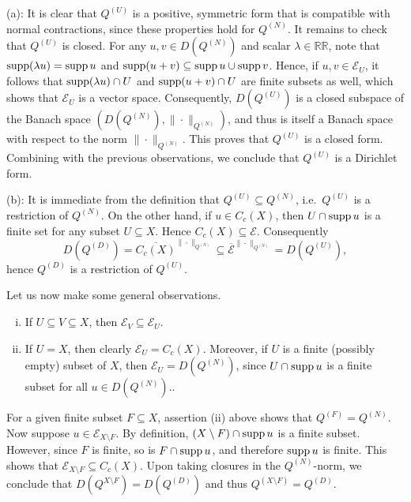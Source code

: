 (a): It is clear that $Q^{(U)}$ is a positive, symmetric form that is compatible with normal contractions, since these properties hold for $Q^{(N)}$. It remains to check that $Q^{(U)}$ is closed. For any $u, v\in D(Q^{(N)})$ and scalar $\lambda\in\mathbb{RR}$, note that $\operatorname{supp} (\lambda u)=\operatorname{supp} u$ and $\operatorname{supp}(u+v) \subseteq \operatorname{supp} u \cup \operatorname{supp} v$. Hence, if $u,v\in\mathcal{E}_U$, it follows that $\operatorname{supp}(\lambda u)\cap U$ and $\operatorname{supp}(u+v)\cap U$ are finite subsets as well, which shows that $\mathcal{E}_U$ is a vector space. Consequently, $D(Q^{(U)})$ is a closed subspace of the Banach space $(D(Q^{(N)}), \|\cdot\|_{Q^{(N)}})$, and thus is itself a Banach space with respect to the norm $\|\cdot\|_{Q^{(N)}}$. This proves that $Q^{(U)}$ is a closed form. Combining with the previous observations, we conclude that $Q^{(U)}$ is a Dirichlet form.

(b): It is immediate from the definition that $Q^{(U)}\subseteq Q^{(N)}$, i.e.\ $Q^{(U)}$ is a restriction of $Q^{(N)}$. On the other hand, if $u \in C_c(X)$, then $U\cap\operatorname{supp} u$ is a finite set for any subset $U\subseteq X$. Hence $C_c(X)\subseteq\mathcal{E}$. Consequently
\begin{equation*}
	D(Q^{(D)}) = \overline{C_c(X)}^{\|\cdot\|_{Q^{(N)}}} \subseteq \overline{\mathcal{E}}^{\|\cdot\|_{Q^{(N)}}} = D(Q^{(U)}),
\end{equation*}
hence $Q^{(D)}$ is a restriction of $Q^{(U)}$.

Let us now make some general observations.
\begin{enumerate}[(i)]
	\item If $U\subseteq V\subseteq X$, then $\mathcal{E}_V\subseteq \mathcal{E}_U$.
	\item If $U=X$, then clearly $\mathcal{E}_U = C_c(X)$. Moreover, if $U$ is a finite (possibly empty) subset of $X$, then $\mathcal{E}_U = D(Q^{(N)})$, since $U\cap\operatorname{supp} u$ is a finite subset for all $u\in D(Q^{(N)}).$.
\end{enumerate}
For a given finite subset $F\subseteq X$, assertion (ii) above shows that $Q^{(F)}=Q^{(N)}$. Now suppose $u\in \mathcal{E}_{X\setminus F}$. By definition, $(X\setminus F)\cap\operatorname{supp} u$ is a finite subset. However, since $F$ is finite, so is $F\cap\operatorname{supp} u$, and therefore $\operatorname{supp} u$ is finite. This shows that $\mathcal{E}_{X\setminus F}\subseteq C_c(X)$. Upon taking closures in the $Q^{(N)}$-norm, we conclude that $D(Q^{X\setminus F})=D(Q^{(D)})$ and thus $Q^{(X\setminus F)}=Q^{(D)}$.